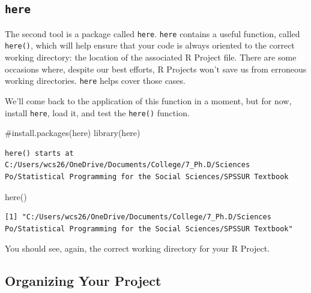 \documentclass[
  letterpaper,
]{book}
\newenvironment{Shaded}{\begin{snugshade}}{\end{snugshade}}
\newcommand{\CommentTok}[1]{\textcolor[rgb]{0.37,0.37,0.37}{#1}}
\newcommand{\FunctionTok}[1]{\textcolor[rgb]{0.28,0.35,0.67}{#1}}
\newcommand{\NormalTok}[1]{\textcolor[rgb]{0.00,0.23,0.31}{#1}}
\begin{document}
\hypertarget{here}{%
\subsection{\texorpdfstring{\texttt{here}}{here}}\label{here}}

The second tool is a package called \texttt{here}. \texttt{here}
contains a useful function, called \texttt{here()}, which will help
ensure that your code is always oriented to the correct working
directory: the location of the associated R Project file. There are some
occasions where, despite our best efforts, R Projects won't save us from
erroneous working directories. \texttt{here} helps cover those cases.

We'll come back to the application of this function in a moment, but for
now, install \texttt{here}, load it, and test the \texttt{here()}
function.

\begin{Shaded}
\begin{Highlighting}[]
\CommentTok{\#install.packages(\textquotesingle{}here\textquotesingle{})}
\FunctionTok{library}\NormalTok{(here)}
\end{Highlighting}
\end{Shaded}

\begin{verbatim}
here() starts at C:/Users/wcs26/OneDrive/Documents/College/7_Ph.D/Sciences Po/Statistical Programming for the Social Sciences/SPSSUR Textbook
\end{verbatim}

\begin{Shaded}
\begin{Highlighting}[]
\FunctionTok{here}\NormalTok{()}
\end{Highlighting}
\end{Shaded}

\begin{verbatim}
[1] "C:/Users/wcs26/OneDrive/Documents/College/7_Ph.D/Sciences Po/Statistical Programming for the Social Sciences/SPSSUR Textbook"
\end{verbatim}

You should see, again, the correct working directory for your R Project.

\hypertarget{organizing-your-project}{%
\subsection{Organizing Your Project}\label{organizing-your-project}}
\end{document}
